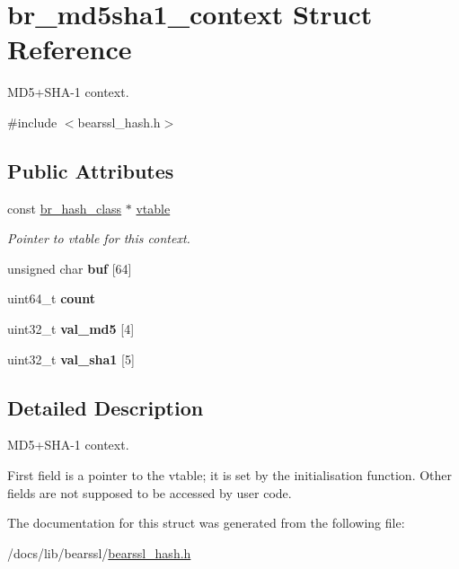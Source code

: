 \hypertarget{structbr__md5sha1__context}{}\section{br\+\_\+md5sha1\+\_\+context Struct Reference}
\label{structbr__md5sha1__context}


M\+D5+\+S\+H\+A-\/1 context.  




{\ttfamily \#include $<$bearssl\+\_\+hash.\+h$>$}

\subsection*{Public Attributes}
\begin{DoxyCompactItemize}
\item 
\mbox{\label{structbr__md5sha1__context_a09d819dd750941a1e29fc0f36a5f2d68}} 
const \hyperlink{bearssl__hash_8h_ae38c1b9d539537cc16fc84388b922d86}{br\+\_\+hash\+\_\+class} $\ast$ \hyperlink{structbr__md5sha1__context_a09d819dd750941a1e29fc0f36a5f2d68}{vtable}
\begin{DoxyCompactList}\small\item\em Pointer to vtable for this context. \end{DoxyCompactList}\item 
\mbox{\label{structbr__md5sha1__context_a82aabfae452d2fad39629cc767e0f2b6}} 
unsigned char {\bfseries buf} \mbox{[}64\mbox{]}
\item 
\mbox{\label{structbr__md5sha1__context_a35304751176ec6b87cc20a8849a735fa}} 
uint64\+\_\+t {\bfseries count}
\item 
\mbox{\label{structbr__md5sha1__context_a8ce87fb0ac9631a315580ad7e1770634}} 
uint32\+\_\+t {\bfseries val\+\_\+md5} \mbox{[}4\mbox{]}
\item 
\mbox{\label{structbr__md5sha1__context_a8be38f3582f7159952267b7063056984}} 
uint32\+\_\+t {\bfseries val\+\_\+sha1} \mbox{[}5\mbox{]}
\end{DoxyCompactItemize}


\subsection{Detailed Description}
M\+D5+\+S\+H\+A-\/1 context. 

First field is a pointer to the vtable; it is set by the initialisation function. Other fields are not supposed to be accessed by user code. 

The documentation for this struct was generated from the following file\+:\begin{DoxyCompactItemize}
\item 
/docs/lib/bearssl/\hyperlink{bearssl__hash_8h}{bearssl\+\_\+hash.\+h}\end{DoxyCompactItemize}

